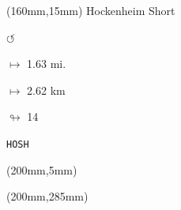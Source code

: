 \begin{textblock*}{40mm}(160mm,15mm)%
Hockenheim Short
\par \Huge$\circlearrowleft$
\Large
\par$\mapsto$ 1.63 mi.
\par$\mapsto$ 2.62 km
\par$\looparrowright$ 14
\par\hfill\tiny\tt HOSH\\
\end{textblock*}
\begin{textblock*}{20mm}(200mm,5mm)%
\fbox{\thepage}
\end{textblock*}
\begin{textblock*}{20mm}(200mm,285mm)%
\fbox{\thepage}
\end{textblock*}
\null\newpage

